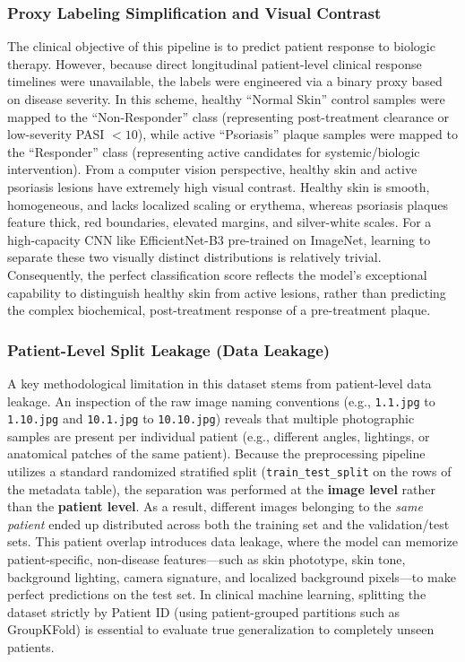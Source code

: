 \documentclass[11pt,journal,compsoc]{IEEEtran}
\begin{document}
\subsubsection{Proxy Labeling Simplification and Visual Contrast}
The clinical objective of this pipeline is to predict patient response to biologic therapy. However, because direct longitudinal patient-level clinical response timelines were unavailable, the labels were engineered via a binary proxy based on disease severity. In this scheme, healthy ``Normal Skin'' control samples were mapped to the ``Non-Responder'' class (representing post-treatment clearance or low-severity PASI $< 10$), while active ``Psoriasis'' plaque samples were mapped to the ``Responder'' class (representing active candidates for systemic/biologic intervention). 
From a computer vision perspective, healthy skin and active psoriasis lesions have extremely high visual contrast. Healthy skin is smooth, homogeneous, and lacks localized scaling or erythema, whereas psoriasis plaques feature thick, red boundaries, elevated margins, and silver-white scales. For a high-capacity CNN like EfficientNet-B3 pre-trained on ImageNet, learning to separate these two visually distinct distributions is relatively trivial. Consequently, the perfect classification score reflects the model's exceptional capability to distinguish healthy skin from active lesions, rather than predicting the complex biochemical, post-treatment response of a pre-treatment plaque.

\subsubsection{Patient-Level Split Leakage (Data Leakage)}
A key methodological limitation in this dataset stems from patient-level data leakage. An inspection of the raw image naming conventions (e.g., \texttt{1.1.jpg} to \texttt{1.10.jpg} and \texttt{10.1.jpg} to \texttt{10.10.jpg}) reveals that multiple photographic samples are present per individual patient (e.g., different angles, lightings, or anatomical patches of the same patient).
Because the preprocessing pipeline utilizes a standard randomized stratified split (\texttt{train\_test\_split} on the rows of the metadata table), the separation was performed at the \textbf{image level} rather than the \textbf{patient level}. As a result, different images belonging to the \emph{same patient} ended up distributed across both the training set and the validation/test sets. 
This patient overlap introduces data leakage, where the model can memorize patient-specific, non-disease features---such as skin phototype, skin tone, background lighting, camera signature, and localized background pixels---to make perfect predictions on the test set. In clinical machine learning, splitting the dataset strictly by Patient ID (using patient-grouped partitions such as GroupKFold) is essential to evaluate true generalization to completely unseen patients.
\end{document}
